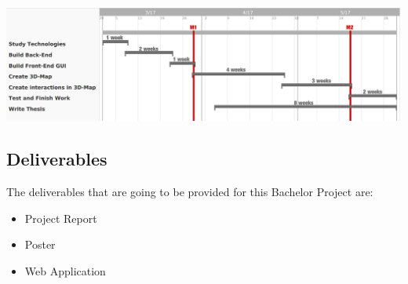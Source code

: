 \documentclass[a4paper]{article}
\begin{document}
\hspace*{-1cm}\includegraphics[scale=0.4]{Plan_timeline}
\\
\subsection*{Deliverables}
The deliverables that are going to be provided for this Bachelor Project are:
\begin{itemize}
	\item Project Report
	\item Poster
	\item Web Application
\end{itemize}
\end{document}
